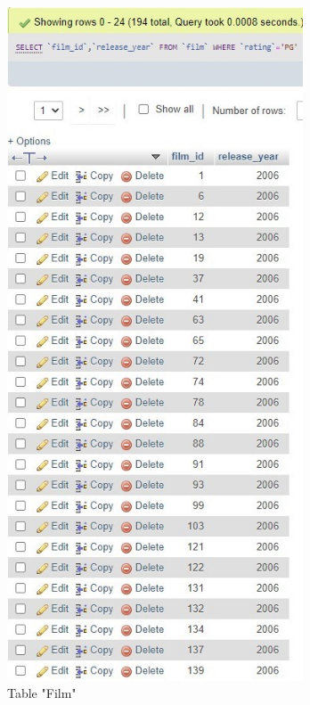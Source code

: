 \documentclass{article}
\begin{document}
		\begin{figure}[H]
			\includegraphics[height = 20cm]{film_selectwhere}
			\caption{Table "Film"}
		\end{figure}
\end{document}
